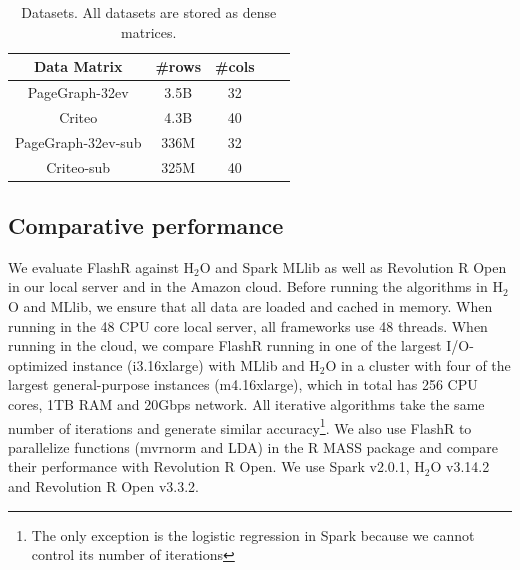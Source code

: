 \begin{table}
\begin{center}
\caption{Datasets. All datasets are stored as dense matrices.}
\vspace{-10pt}
\footnotesize
\begin{tabular}{|c|c|c|c|c|}
\hline
Data Matrix & \#rows & \#cols \\
\hline
PageGraph-32ev \cite{webgraph} & 3.5B & 32 \\
\hline
Criteo \cite{criteo} & 4.3B & 40 \\
\hline
PageGraph-32ev-sub \cite{webgraph} & 336M & 32 \\
\hline
Criteo-sub \cite{criteo} & 325M & 40 \\
\hline
\end{tabular}
\normalsize
\label{tbl:data}
\end{center}
\vspace{-10pt}
\end{table}

\subsection{Comparative performance}
We evaluate FlashR against H$_2$O \cite{h2o} and Spark MLlib \cite{mllib} as well
as Revolution R Open \cite{rro} in our local server and in the Amazon cloud.
Before running the algorithms in H$_2$O and MLlib, we ensure that all data are
loaded and cached in memory. When running in the 48 CPU core local server,
all frameworks use 48 threads. When running in the cloud, we compare FlashR
running in one of the largest I/O-optimized instance (i3.16xlarge) with MLlib
and H$_2$O in a cluster with four of the largest general-purpose instances
(m4.16xlarge), which in total has 256 CPU cores, 1TB RAM and 20Gbps network.
All iterative algorithms take the same number of iterations and generate
similar accuracy\footnote{The only exception is the logistic regression in Spark
because we cannot control its number of iterations}.
We also use FlashR to parallelize functions (mvrnorm and LDA)
in the R MASS package and compare their performance with Revolution R Open. We use
Spark v2.0.1, H$_2$O v3.14.2 and Revolution R Open v3.3.2.

